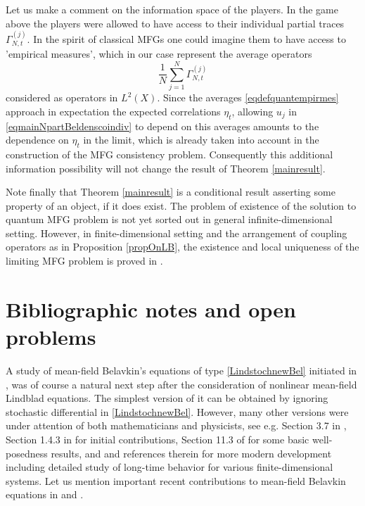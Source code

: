 \documentclass[12pt]{article}
\newtheorem{remark}{Remark}
\newcommand{\Ga}{\Gamma}
\begin{document}
Let us make a comment on the information space of the players.
In the game above the players were allowed to have access to their individual partial traces $\Ga_{N,t}^{(j)}$.
In the spirit of classical MFGs one could imagine them to have access to 'empirical measures',
which in our case represent the average operators
 \begin{equation}
\label{eqdefquantempirmes}
\frac{1}{N} \sum_{j=1}^N \Ga_{N,t}^{(j)}
\end{equation}
considered as operators in $L^2(X)$.
Since the averages \eqref{eqdefquantempirmes} approach in expectation the expected correlations $\eta_t$,
allowing $u_j$   in \eqref{eqmainNpartBeldenscoindiv} to depend on this averages amounts
to the dependence on $\eta_t$ in the limit, which is already taken into account in the construction of the MFG
consistency problem. Consequently this additional information possibility will not change the result
of Theorem  \ref{mainresult}.

 Note finally that Theorem \ref{mainresult} is a conditional result asserting some property of an object,
 if it does exist. The problem of existence of the solution to quantum MFG problem is not yet sorted out
 in general infinite-dimensional setting. However, in finite-dimensional setting and the arrangement
 of coupling operators as in Proposition \ref{propOnLB}, the existence and local uniqueness
 of the limiting MFG problem is proved in \cite{KolQuantMFG}.


\section{Bibliographic notes and open problems}
\label{secbibopen}

A study of mean-field Belavkin's equations of type \eqref{LindstochnewBel} initiated in
\cite{KolQuantLLN}, \cite{KolQuantMFG} was of course a natural next step after
the consideration of nonlinear mean-field Lindblad equations. The simplest version of it can be obtained
by ignoring stochastic differential in \eqref{LindstochnewBel}. However, many other versions were under
attention of both mathematicians and physicists, see e.g. Section 3.7 in \cite{Breuer}, Section 1.4.3 in
\cite{Alicki} for initial contributions, Section 11.3 of \cite{Kolbook10}
for some basic well-posedness results, and \cite{Fernen} and references therein
for more modern development
 including detailed study of long-time behavior for various finite-dimensional systems.
Let us mention important recent contributions to mean-field Belavkin equations in
\cite{Bouard} and \cite{Chalal}.
\end{document}

